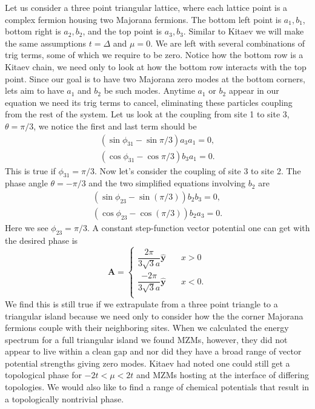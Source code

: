 \documentclass[aps,prb,showpacs,amsmath,amssymb,superscriptaddress]{revtex4-2}
\let\oldhat\hat
\renewcommand{\hat}[1]{\oldhat{\mathbf{#1}}}
\renewcommand{\vec}[1]{\mathbf{#1}}
\newcommand{\de}{\Delta}
\begin{document}
Let us consider a three point triangular lattice, where each lattice point is a complex fermion housing two Majorana fermions.
The bottom left point is $a_1, b_1$, bottom right is $a_2, b_2$, and the top point is $a_3, b_3$.
Similar to Kitaev we will make the same assumptions $t=\de$ and $\mu=0$.
We are left with several combinations of trig terms, some of which we require to be zero.
Notice how the bottom row is a Kitaev chain, we need only to look at how the bottom row interacts with the top point.
Since our goal is to have two Majorana zero modes at the bottom corners, lets aim to have $a_1$ and $b_2$ be such modes.
Anytime $a_1$ or $b_2$ appear in our equation we need its trig terms to cancel, eliminating these particles coupling from the rest of the system.
Let us look at the coupling from site 1 to site 3, $\theta = \pi/3$, we notice the first and last term should be
\begin{align}
  (\sin\phi_{31} - \sin\pi/3) a_3 a_1 = 0, \\
  (\cos\phi_{31} - \cos\pi/3) b_3 a_1 = 0.
\end{align}
This is true if $\phi_{31} = \pi/3$.
Now let's consider the coupling of site 3 to site 2.
The phase angle $\theta = -\pi/3$ and the two simplified equations involving $b_2$ are
\begin{align}
  (\sin\phi_{23} - \sin(\pi/3)) b_2 b_3 = 0, \nonumber \\
  (\cos\phi_{23} - \cos(\pi/3)) b_2 a_3 = 0. \nonumber
\end{align}
Here we see $\phi_{23} = \pi/3$.
A constant step-function vector potential one can get with the desired phase is
\begin{equation}
  \vec{A} = \begin{cases}
      \dfrac{2 \pi}{3\sqrt{3}a} \hat{y} \quad &x > 0 \\
      \dfrac{-2 \pi}{3\sqrt{3}a} \hat{y} \quad &x < 0. \\
            \end{cases}
\end{equation}
We find this is still true if we extrapulate from a three point triangle to a triangular island because we need only to consider how the the corner Majorana fermions couple with their neighboring sites.
When we calculated the energy spectrum for a full triangular island we found MZMs, however, they did not appear to live within a clean gap and nor did they have a broad range of vector potential strengths giving zero modes.
Kitaev had noted one could still get a topological phase for $-2t<\mu<2t$ and MZMs hosting at the interface of differing topologies.
We would also like to find a range of chemical potentials that result in a topologically nontrivial phase.
\end{document}
